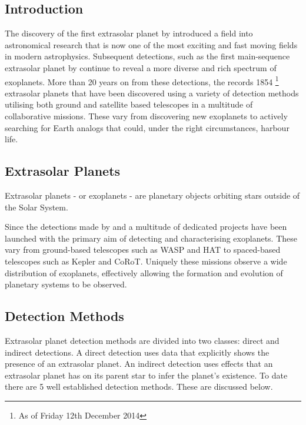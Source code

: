 \documentclass[twoside,4pt]{article}
\begin{document}
\begin{multicols}{2} %

\section{Introduction}
The discovery of the first extrasolar planet by \textcite{first} introduced a field into astronomical research that is now one of the most exciting and fast moving fields in modern astrophysics. Subsequent detections, such as the first main-sequence extrasolar planet by \textcite{MQ} continue to reveal a more diverse and rich spectrum of exoplanets. More than 20 years on from these detections, the \textcite{exo} records 1854 \footnote{As of Friday 12th December 2014} extrasolar planets that have been discovered using a variety of detection methods utilising both ground and satellite based telescopes in a multitude of collaborative missions. These vary from discovering new exoplanets to actively searching for Earth analogs that could, under the right circumstances, harbour life.

\subsection{Extrasolar Planets}
Extrasolar planets - or exoplanets - are planetary objects orbiting stars outside of the Solar System.  

Since the detections made by \citeauthor{first} and \citeauthor{MQ} a multitude of dedicated projects have been launched with the primary aim of detecting and characterising exoplanets. These vary from ground-based telescopes such as WASP and HAT to spaced-based telescopes such as Kepler and CoRoT. Uniquely these missions observe a wide distribution of exoplanets, effectively allowing the formation and evolution of planetary systems to be observed. 

\subsection{Detection Methods}
Extrasolar planet detection methods are divided into two classes: direct and indirect detections. A direct detection uses data that explicitly shows the presence of an extrasolar planet. An indirect detection uses effects that an extrasolar planet has on its parent star to infer the planet's existence. To date there are 5 well established detection methods. These are discussed below.  


\end{multicols}
\end{document}
